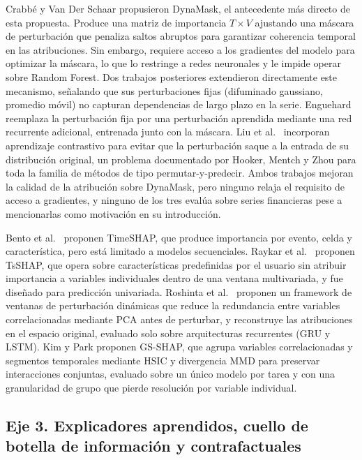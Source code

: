 Crabbé y Van Der Schaar \cite{crabbe2021} propusieron DynaMask, el antecedente más directo de esta propuesta. Produce una matriz de importancia $T \times V$ ajustando una máscara de perturbación que penaliza saltos abruptos para garantizar coherencia temporal en las atribuciones. Sin embargo, requiere acceso a los gradientes del modelo para optimizar la máscara, lo que lo restringe a redes neuronales y le impide operar sobre Random Forest. Dos trabajos posteriores extendieron directamente este mecanismo, señalando que sus perturbaciones fijas (difuminado gaussiano, promedio móvil) no capturan dependencias de largo plazo en la serie. Enguehard \cite{enguehard2023} reemplaza la perturbación fija por una perturbación aprendida mediante una red recurrente adicional, entrenada junto con la máscara. Liu et al.\ \cite{liu2024contralsp} incorporan aprendizaje contrastivo para evitar que la perturbación saque a la entrada de su distribución original, un problema documentado por Hooker, Mentch y Zhou \cite{hooker2021} para toda la familia de métodos de tipo permutar-y-predecir. Ambos trabajos mejoran la calidad de la atribución sobre DynaMask, pero ninguno relaja el requisito de acceso a gradientes, y ninguno de los tres evalúa sobre series financieras pese a mencionarlas como motivación en su introducción.

Bento et al.\ \cite{bento2021} proponen TimeSHAP, que produce importancia por evento, celda y característica, pero está limitado a modelos secuenciales. Raykar et al.\ \cite{raykar2023} proponen TsSHAP, que opera sobre características predefinidas por el usuario sin atribuir importancia a variables individuales dentro de una ventana multivariada, y fue diseñado para predicción univariada. Roshinta et al.\ \cite{roshinta2026} proponen un framework de ventanas de perturbación dinámicas que reduce la redundancia entre variables correlacionadas mediante PCA antes de perturbar, y reconstruye las atribuciones en el espacio original, evaluado solo sobre arquitecturas recurrentes (GRU y LSTM). Kim y Park \cite{gsshap2026} proponen GS-SHAP, que agrupa variables correlacionadas y segmentos temporales mediante HSIC y divergencia MMD para preservar interacciones conjuntas, evaluado sobre un único modelo por tarea y con una granularidad de grupo que pierde resolución por variable individual.

\subsection{Eje 3. Explicadores aprendidos, cuello de botella de información y contrafactuales}

